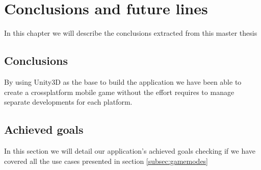 \chapter{Conclusions and future lines}
\label{chap:conclusions}
\begin{chapterintro}
In this chapter we will describe the conclusions extracted from this master thesis
\end{chapterintro}

\cleardoublepage
\section{Conclusions}

By using Unity3D as the base to build the application we have been able to create a crossplatform mobile game without the effort requires to manage separate developments for each platform.



\section{Achieved goals}

In this section we will detail our application's achieved goals checking if we have covered all the use cases presented in section \ref{subsec:gamemodes} 

